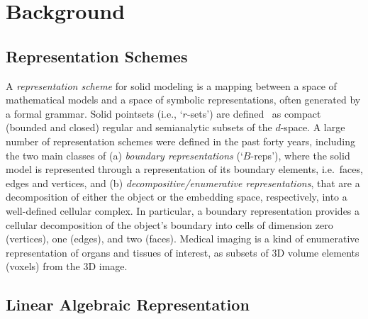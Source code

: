 \section{Background}\label{sec:background}


\subsection{Representation Schemes}\label{sec:aaaa}

A \emph{representation scheme} for solid modeling is a mapping between a space of mathematical models and a space of symbolic representations, often generated by a formal grammar.
Solid pointsets (i.e., `$r$-sets') are defined~\cite{requicha:80} as compact (bounded and closed) regular and semianalytic subsets of the $d$-space. A large number of representation schemes were defined in the past forty years, including the two main classes of (a) \emph{boundary representations} (`$B$-reps'), where the solid model is represented through a representation of its boundary elements, i.e.~faces, edges and vertices, and (b) \emph{decompositive/enumerative representations}, that are a decomposition of either the object or the embedding space, respectively, into a well-defined cellular complex. In particular, a boundary representation provides a cellular decomposition of the object's boundary into cells of dimension zero (vertices), one (edges), and two (faces). Medical imaging is a kind of enumerative representation of organs and tissues of interest, as subsets of 3D volume elements (voxels) from the 3D image. 


\subsection{Linear Algebraic Representation}\label{sec:aaaa}

